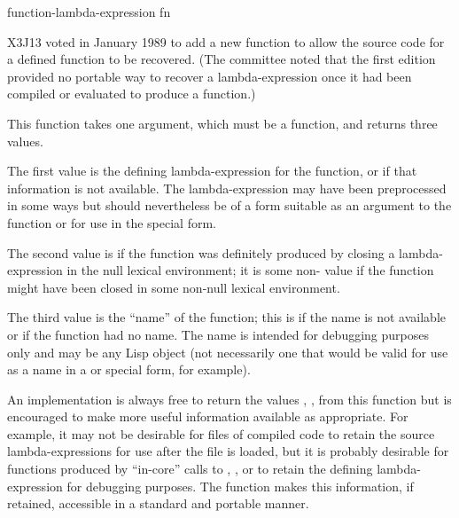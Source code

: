 \begin{new}
\begin{defun}[Function]
function-lambda-expression fn

X3J13 voted in January 1989
to add a new function to allow the
source code for a defined function to be recovered.
(The committee noted that the first edition provided no
portable way to recover a lambda-expression once it had
been compiled or evaluated to produce a function.)

This function takes one argument, which must be a function, and returns
three values.

The first value is the defining lambda-expression for the
function, or {\false} if that information is not available.
The lambda-expression may have been preprocessed in some ways
but should nevertheless be of a form suitable as an argument
to the function  or for use in the  special form.

The second value is {\false} if the function was definitely
produced by closing
a lambda-expression in the null lexical environment; it is some
non-{\false} value if the function might have been closed in some
non-null lexical environment.

The third value is the ``name'' of the function; this is {\false} if the
name is not available or if the function had no name.
The name is intended for debugging purposes only and may be
any Lisp object (not necessarily one that would be valid for use as a name
in a  or  special form, for example).

\beforenoterule
\begin{implementation}
An implementation is always free to return the values
{\false}, , {\false} from this function but is encouraged to
make more useful information available as appropriate.
For example, it may not be desirable for files of compiled code
to retain the source lambda-expressions for use after the file is loaded,
but it is probably desirable for
functions produced by ``in-core'' calls to ,
, or  to retain the defining lambda-expression
for debugging purposes.  The function 
makes this information, if retained, accessible in a standard and portable
manner.
\end{implementation}
\afternoterule
\end{defun}
\end{new}


